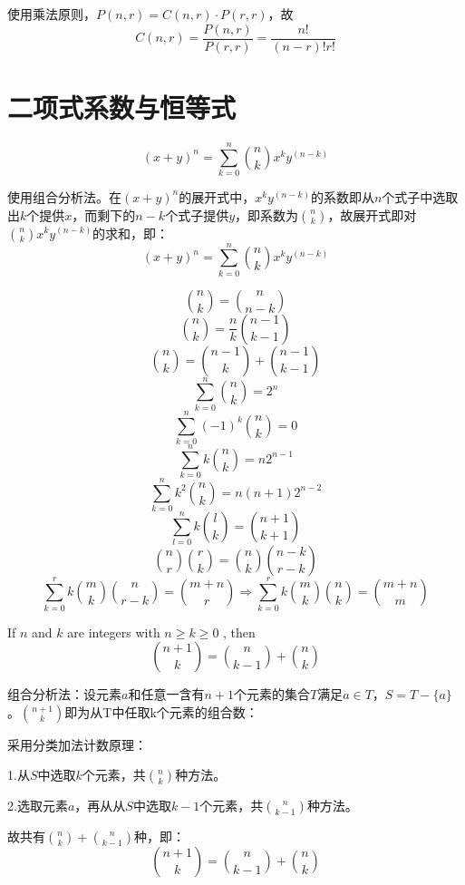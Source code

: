 \documentclass[cyan]{elegantnote}
\begin{document}
\begin{newproof}
   使用乘法原则，$P(n,r)=C(n,r)\cdot{}P(r,r)$，故
   \[C(n,r)=\frac{P(n,r)}{P(r,r)}=\frac{n!}{(n-r)!r!}\]
\end{newproof}

\section{二项式系数与恒等式}
\begin{newprop}[二项式定理]
   \[(x+y)^n=\sum_{k=0}^n\binom{n}{k}x^ky^{(n-k)}\]   
\end{newprop}

\begin{newproof}
   使用组合分析法。在$(x+y)^n$的展开式中，$x^ky^{(n-k)}$的系数即从$n$个式子中选取出$k$个提供$x$，而剩下的$n-k$个式子提供$y$，即系数为$\binom{n}{k}$，故展开式即对$\binom{n}{k}x^ky^{(n-k)}$的求和，即：\[(x+y)^n=\sum_{k=0}^n\binom{n}{k}x^ky^{(n-k)}\] 
\end{newproof}

\begin{newprop}[组合计数恒等式]
   \[\binom{n}{k}=\binom{n}{n-k}\]
   \[\binom{n}{k}=\frac{n}{k}\binom{n-1}{k-1}\]
   \[\binom{n}{k}=\binom{n-1}{k}+\binom{n-1}{k-1}\]
   \[\sum_{k=0}^n\binom{n}{k}=2^n\]
   \[\sum_{k=0}^n(-1)^k\binom{n}{k}=0\]
   \[\sum_{k=0}^nk\binom{n}{k}=n2^{n-1}\]
   \[\sum_{k=0}^nk^2\binom{n}{k}=n(n+1)2^{n-2}\]
   \[\sum_{l=0}^nk\binom{l}{k}=\binom{n+1}{k+1}\]
   \[\binom{n}{r}\binom{r}{k}=\binom{n}{k}\binom{n-k}{r-k}\]
   \[\sum_{k=0}^rk\binom{m}{k}\binom{n}{r-k}=\binom{m+n}{r}\Rightarrow\sum_{k=0}^rk\binom{m}{k}\binom{n}{k}=\binom{m+n}{m}\]
\end{newprop}

\begin{newprop}[Pascal恒等式]
   If $n$ and $k$ are integers with $n\geq k\geq 0$ , then
   \[\binom{n+1}{k}=\binom{n}{k-1}+\binom{n}{k}\]
\end{newprop}

\begin{newproof}

   组合分析法：设元素$a$和任意一含有$n+1$个元素的集合$T$满足$a\in T$，$S=T-\{a\}$。$\binom{n+1}{k}$即为从T中任取k个元素的组合数：

   采用分类加法计数原理：

   1.从$S$中选取$k$个元素，共$\binom{n}{k}$种方法。

   2.选取元素$a$，再从从$S$中选取$k-1$个元素，共$\binom{n}{k-1}$种方法。

   故共有$\binom{n}{k}+\binom{n}{k-1}$种，即：
   \[\binom{n+1}{k}=\binom{n}{k-1}+\binom{n}{k}\]

\end{newproof}
\end{document}

